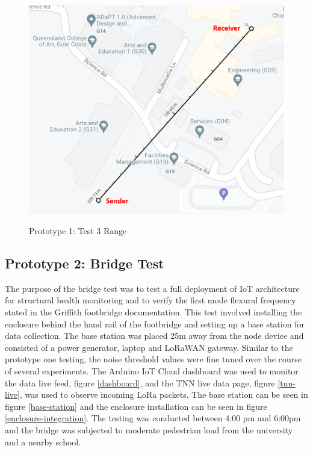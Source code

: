 \begin{figure}[H]
	\centering
	\caption{Prototype 1: Test 3 Range \cite{test3-range}}
	\includegraphics[width=\textwidth]{Sections/Prototype-Testing/test3-range-label.png}
	\label{proto1-test3-range}
\end{figure}

\subsection{Prototype 2: Bridge Test}
The purpose of the bridge test was to test a full deployment of IoT architecture for structural health monitoring and to verify the first mode flexural frequency stated in the Griffith footbridge documentation. This test involved installing the enclosure behind the hand rail of the footbridge and setting up a base station for data collection. The base station was placed 25m away from the node device and consisted of a power generator, laptop and LoRaWAN gateway. Similar to the prototype one testing, the noise threshold values were fine tuned over the course of several experiments. The Arduino IoT Cloud dashboard was used to monitor the data live feed, figure \ref{dashboard}, and the TNN live data page, figure \ref{tnn-live}, was used to observe incoming LoRa packets. The base station can be seen in figure \ref{base-station} and the enclosure installation can be seen in figure \ref{enclosure-integration}. The testing was conducted between 4:00 pm and 6:00pm and the bridge was subjected to moderate pedestrian load from the university and a nearby school. 

